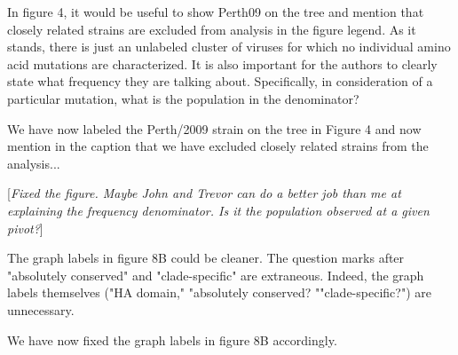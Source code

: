 \documentclass[11pt, oneside]{article}   	%
\newcommand{\comment}[1]{{\color{red}[\textsl{#1}]}}
\newcommand{\response}[1]{{\color{black}#1}}
\begin{document}
In figure 4, it would be useful to show Perth09 on the tree and mention that closely related strains are excluded from analysis in the figure legend. As it stands, there is just an unlabeled cluster of viruses for which no individual amino acid mutations are characterized. It is also important for the authors to clearly state what frequency they are talking about. Specifically, in consideration of a particular mutation, what is the population in the denominator? 

\response{We have now labeled the Perth/2009 strain on the tree in Figure 4 and now mention in the caption that we have excluded closely related strains from the analysis...
}

\comment{Fixed the figure. Maybe John and Trevor can do a better job than me at explaining the frequency denominator. Is it the population observed at a given pivot?}

The graph labels in figure 8B could be cleaner. The question marks after "absolutely conserved" and "clade-specific" are extraneous. Indeed, the graph labels themselves ("HA domain," "absolutely conserved? ""clade-specific?") are unnecessary. 

\response{We have now fixed the graph labels in figure 8B accordingly.}
\end{document}
